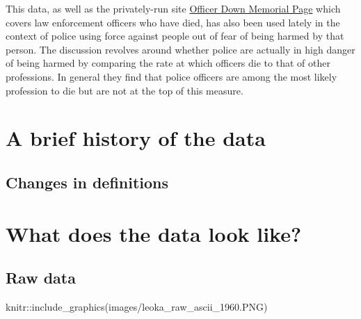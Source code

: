 \documentclass[
  12pt,
  openany]{book}
\newenvironment{Shaded}{\begin{snugshade}}{\end{snugshade}}
\newcommand{\FunctionTok}[1]{\textcolor[rgb]{0,0,0}{#1}}
\newcommand{\NormalTok}[1]{#1}
\newcommand{\SpecialCharTok}[1]{\textcolor[rgb]{0,0,0}{#1}}
\newcommand{\StringTok}[1]{\textcolor[rgb]{0.5,0.5,0.5}{#1}}
\begin{document}
This data, as well as the privately-run site \href{https://www.odmp.org/}{Officer Down Memorial Page} which covers law enforcement officers who have died, has also been used lately in the context of police using force against people out of fear of being harmed by that person. The discussion revolves around whether police are actually in high danger of being harmed by comparing the rate at which officers die to that of other professions. In general they find that police officers are among the most likely profession to die but are not at the top of this measure.

\hypertarget{a-brief-history-of-the-data-2}{%
\section{A brief history of the data}\label{a-brief-history-of-the-data-2}}

\hypertarget{changes-in-definitions-2}{%
\subsection{Changes in definitions}\label{changes-in-definitions-2}}

\hypertarget{what-does-the-data-look-like-2}{%
\section{What does the data look like?}\label{what-does-the-data-look-like-2}}

\hypertarget{raw-data-2}{%
\subsection{Raw data}\label{raw-data-2}}

\begin{Shaded}
\begin{Highlighting}[]
\NormalTok{knitr}\SpecialCharTok{::}\FunctionTok{include\_graphics}\NormalTok{(}\StringTok{\textquotesingle{}images/leoka\_raw\_ascii\_1960.PNG\textquotesingle{}}\NormalTok{)}
\end{Highlighting}
\end{Shaded}
\end{document}
